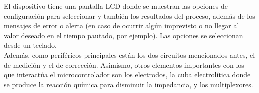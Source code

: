 El dispositivo tiene una pantalla LCD donde se muestran las opciones de configuración para seleccionar y también los resultados del proceso, además de los mensajes de error o alerta (en caso de ocurrir algún imprevisto o no llegar al valor deseado en el tiempo pautado, por ejemplo). Las opciones se seleccionan desde un teclado.\\

Además, como periféricos principales están los dos circuitos mencionados antes, el de medición y el de corrección. Asimismo, otros elementos importantes con los que interactúa el microcontrolador son los electrodos, la cuba electrolítica donde se produce la reacción química para disminuir la impedancia, y  los multiplexores.\\


